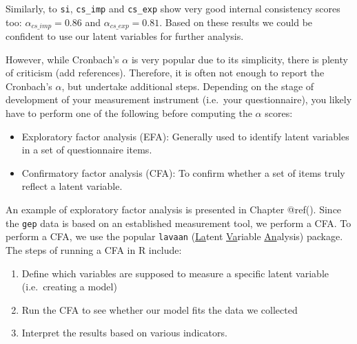 \documentclass[
]{book}
\begin{document}
Similarly, to \texttt{si}, \texttt{cs\_imp} and \texttt{cs\_exp} show very good internal consistency scores too: \(\alpha_{cs\_imp} = 0.86\) and \(\alpha_{cs\_exp} = 0.81\). Based on these results we could be confident to use our latent variables for further analysis.

However, while Cronbach's \(\alpha\) is very popular due to its simplicity, there is plenty of criticism (add references). Therefore, it is often not enough to report the Cronbach's \(\alpha\), but undertake additional steps. Depending on the stage of development of your measurement instrument (i.e.~your questionnaire), you likely have to perform one of the following before computing the \(\alpha\) scores:

\begin{itemize}
\item
  Exploratory factor analysis (EFA): Generally used to identify latent variables in a set of questionnaire items.
\item
  Confirmatory factor analysis (CFA): To confirm whether a set of items truly reflect a latent variable.
\end{itemize}

An example of exploratory factor analysis is presented in Chapter @ref(). Since the \texttt{gep} data is based on an established measurement tool, we perform a CFA. To perform a CFA, we use the popular \texttt{lavaan} (\underline{La}tent \underline{Va}riable \underline{An}alysis) package. The steps of running a CFA in R include:

\begin{enumerate}
\def\labelenumi{\arabic{enumi}.}
\item
  Define which variables are supposed to measure a specific latent variable (i.e.~creating a model)
\item
  Run the CFA to see whether our model fits the data we collected
\item
  Interpret the results based on various indicators.
\end{enumerate}
\end{document}
